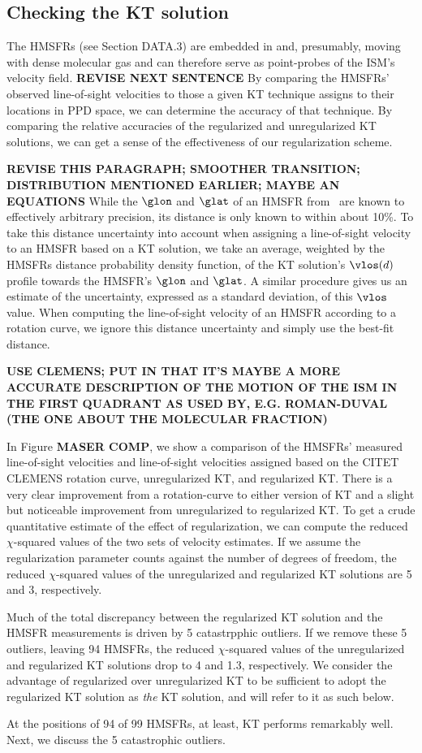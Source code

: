 \subsection{Checking the KT solution}
\label{sec:KT-validation}

The \Reid{} HMSFRs (see Section DATA.3) are embedded in and, presumably, moving with dense molecular gas and can therefore serve as point-probes of the ISM's velocity field. 
{\bf REVISE NEXT SENTENCE} By comparing the HMSFRs' observed line-of-sight velocities to those a given KT technique assigns to their locations in PPD space, we can determine the accuracy of that technique.
By comparing the relative accuracies of the regularized and unregularized KT solutions, we can get a sense of the effectiveness of our regularization scheme.

{\bf REVISE THIS PARAGRAPH; SMOOTHER TRANSITION; DISTRIBUTION MENTIONED EARLIER; MAYBE AN EQUATIONS}
While the $\glon$ and $\glat$ of an HMSFR from \ are known to effectively arbitrary precision, its distance is only known to within about 10\%. 
To take this distance uncertainty into account when assigning a line-of-sight velocity to an HMSFR based on a KT solution, we take an average, weighted by the HMSFRs distance probability density function, of the KT solution's $\vlos(d)$ profile towards the HMSFR's $\glon$ and $\glat$. 
A similar procedure gives us an estimate of the uncertainty, expressed as a standard deviation, of this $\vlos$ value. 
When computing the line-of-sight velocity of an HMSFR according to a rotation curve, we ignore this distance uncertainty and simply use the best-fit distance. 

{\bf USE CLEMENS; PUT IN THAT IT'S MAYBE A MORE ACCURATE DESCRIPTION OF THE MOTION OF THE ISM IN THE FIRST QUADRANT AS USED BY, E.G. ROMAN-DUVAL (THE ONE ABOUT THE MOLECULAR FRACTION)}

In Figure {\bf MASER COMP}, we show a comparison of the HMSFRs' measured line-of-sight velocities and line-of-sight velocities assigned based on the CITET CLEMENS rotation curve, unregularized KT, and regularized KT.
There is a very clear improvement from a rotation-curve to either version of KT and a slight but noticeable improvement from unregularized to regularized KT. 
To get a crude quantitative estimate of the effect of regularization, we can compute the reduced $\chi$-squared values of the two sets of velocity estimates. 
If we assume the regularization parameter counts against the number of degrees of freedom, the reduced $\chi$-squared values of the unregularized and regularized KT solutions are 5 and 3, respectively. 

Much of the total discrepancy between the regularized KT solution and the HMSFR measurements is driven by 5 catastrpphic outliers. 
If we remove these 5 outliers, leaving 94 HMSFRs, the reduced $\chi$-squared values of the unregularized and regularized KT solutions drop to 4 and 1.3, respectively. 
We consider the advantage of regularized over unregularized KT to be sufficient to adopt the regularized KT solution as \emph{the} KT solution, and will refer to it as such below.

At the positions of 94 of 99 HMSFRs, at least, KT performs remarkably well. 
Next, we discuss the 5 catastrophic outliers.
